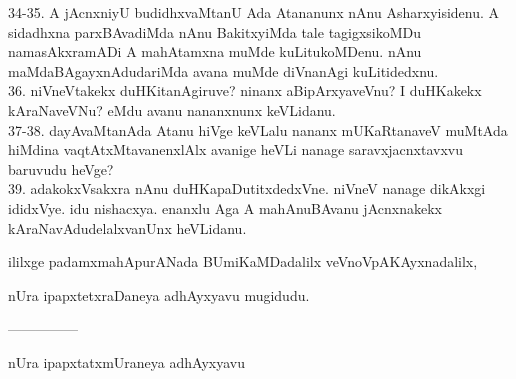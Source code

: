 \documentclass{article}
\begin{document}
34-35. A jAcnxniyU budidhxvaMtanU Ada Atananunx nAnu Asharxyisidenu. A sidadhxna parxBAvadiMda nAnu BakitxyiMda tale tagigxsikoMDu namasAkxramADi A mahAtamxna muMde kuLitukoMDenu. nAnu maMdaBAgayxnAdudariMda avana muMde diVnanAgi kuLitidedxnu.\\
36. niVneVtakekx duHKitanAgiruve? ninanx aBipArxyaveVnu? I duHKakekx kAraNaveVNu? eMdu avanu nananxnunx keVLidanu.\\
37-38. dayAvaMtanAda Atanu hiVge keVLalu nananx mUKaRtanaveV muMtAda hiMdina vaqtAtxMtavanenxlAlx avanige heVLi nanage saravxjacnxtavxvu baruvudu heVge?\\
39. adakokxVsakxra nAnu duHKapaDutitxdedxVne. niVneV nanage dikAkxgi ididxVye. idu nishacxya. enanxlu Aga A mahAnuBAvanu jAcnxnakekx kAraNavAdudelalxvanUnx heVLidanu.

\begin{center}
ililxge padamxmahApurANada BUmiKaMDadalilx veVnoVpAKAyxnadalilx,
\end{center}

\begin{center}
nUra ipapxtetxraDaneya adhAyxyavu mugidudu.
\end{center}

\begin{center}
---------------
\end{center}

\begin{center}
nUra ipapxtatxmUraneya adhAyxyavu
\end{center}
\end{document}
